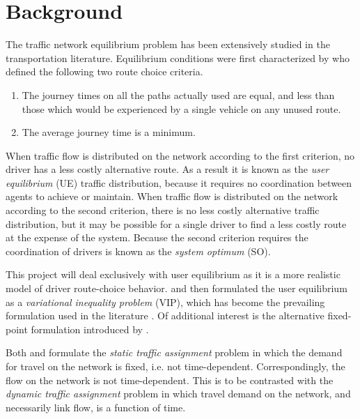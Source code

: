 \section{Background}

The traffic network equilibrium problem has been extensively studied in the transportation literature.
Equilibrium conditions were first characterized by \citet{wardrop1952some} who defined the following two route choice criteria.

\begin{enumerate}
    \item The journey times on all the paths actually used are equal, and less than those which would be experienced by a single vehicle on any unused route.
    \item The average journey time is a minimum.
\end{enumerate}

When traffic flow is distributed on the network according to the first criterion, no driver has a less costly alternative route.
As a result it is known as the \textit{user equilibrium} (UE) traffic distribution, because it requires no coordination between agents to achieve or maintain.
When traffic flow is distributed on the network according to the second criterion, there is no less costly alternative traffic distribution, but it may be possible for a single driver to find a less costly route at the expense of the system.
Because the second criterion requires the coordination of drivers is known as the \textit{system optimum} (SO).

This project will deal exclusively with user equilibrium as it is a more realistic model of driver route-choice behavior.
\citet{smith1979existence} and \citet{dafermos1980traffic} then formulated the user equilibrium as a \textit{variational inequality problem} (VIP), which has become the prevailing formulation used in the literature \citep{nagurney2009netecon}.
Of additional interest is the alternative fixed-point formulation introduced by \citet{smith1979existence}.

Both \citet{smith1979existence} and \citet{dafermos1980traffic} formulate the \textit{static traffic assignment} problem in which the demand for travel on the network is fixed, i.e. not time-dependent.
Correspondingly, the flow on the network is not time-dependent.
This is to be contrasted with the \textit{dynamic traffic assignment} problem in which travel demand on the network, and necessarily link flow, is a function of time. 

